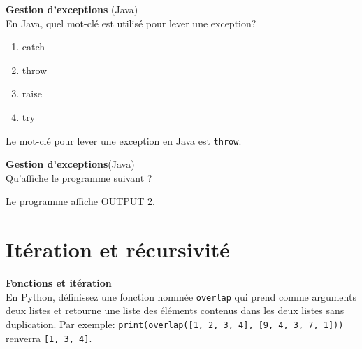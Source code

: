 \begin{Exercice}[5 minutes]\textbf{Gestion d'exceptions} (Java)\\

    En Java, quel mot-clé est utilisé pour lever une exception?

    \begin{enumerate}
        \item catch
        \item throw
        \item raise 
        \item try
    \end{enumerate}
    
    \begin{solution}   
    Le mot-clé pour lever une exception en Java est \lstinline{throw}.
        
    \end{solution}
        
 \end{Exercice}

 \begin{Exercice}[5 minutes]\textbf{Gestion d'exceptions}(Java)\\
    Qu'affiche le programme suivant ?
    
        
        \begin{solution}   
        Le programme affiche OUTPUT 2.             
        \end{solution}
        
 \end{Exercice}



    



\section{Itération et récursivité}

\begin{Exercice}[10 minutes] \textbf{Fonctions et itération}
    \\
    En Python, définissez une fonction nommée \lstinline{overlap} qui prend comme arguments deux listes et retourne une liste des éléments contenus dans les deux listes sans duplication.
    Par exemple:
    \lstinline{print(overlap([1, 2, 3, 4], [9, 4, 3, 7, 1]))} renverra \lstinline{[1, 3, 4]}.

    \begin{solution}
        
    \end{solution}
\end{Exercice}

